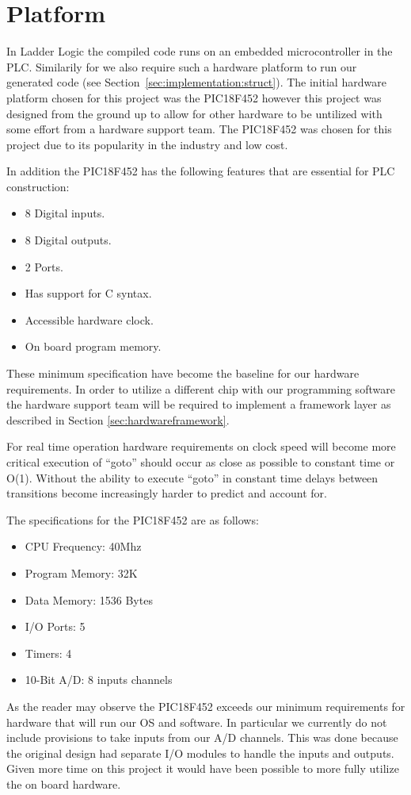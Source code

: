 \section{Platform}
\label{sec:hardwareplatform}

In Ladder Logic the compiled code runs on an embedded microcontroller in the PLC. Similarily for \plccharts we also require such a hardware platform to run our generated code (see Section~\ref{sec:implementation:struct}). The initial hardware platform chosen for this project was the PIC18F452 however this project was designed from the ground up to allow for other hardware to be untilized with some effort from a hardware support team. The PIC18F452 was chosen for this project due to its popularity in the industry and low cost.

In addition the PIC18F452 has the following features that are essential 
for PLC construction:

\begin{itemize}
\item 8 Digital inputs.
\item 8 Digital outputs.
\item 2 Ports.
\item Has support for C syntax.
\item Accessible hardware clock.
\item On board program memory.
\end{itemize}

These minimum specification have become the baseline for our hardware 
requirements. In order to utilize a different chip with our programming 
software the hardware support team will be required to implement a framework 
layer as described in Section \ref{sec:hardwareframework}.

For real time operation hardware requirements on clock speed will 
become more critical execution of ``goto'' should occur as close as
 possible to constant time or O(1). Without the ability to execute 
 ``goto'' in constant time delays between transitions become 
 increasingly harder to predict and account for.

The specifications for the PIC18F452 are as follows:
\begin{itemize}
	\item CPU Frequency: 40Mhz
	\item Program Memory: 32K
	\item Data Memory: 1536 Bytes
	\item I/O Ports: 5
	\item Timers: 4
	\item 10-Bit A/D: 8 inputs channels
\end{itemize}

As the reader may observe the PIC18F452 exceeds our minimum 
requirements for hardware that will run our OS and software. In 
particular we currently do not include provisions to take inputs 
from our A/D channels. This was done because the original design had 
separate I/O modules to handle the inputs and outputs. Given more 
time on this project it would have been possible to more fully utilize 
the on board hardware.
